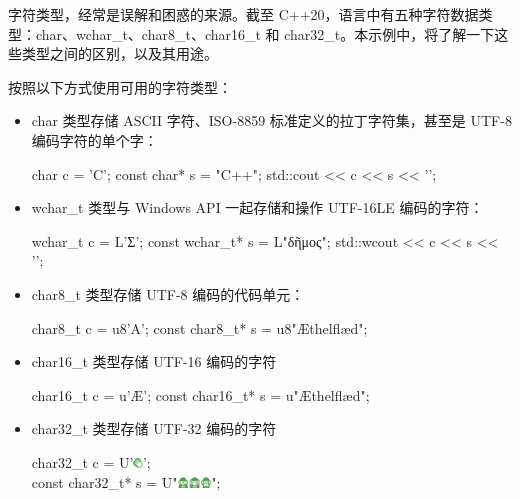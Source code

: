 字符类型，经常是误解和困惑的来源。截至 C++20，语言中有五种字符数据类型：char、wchar\_t、char8\_t、char16\_t 和 char32\_t。本示例中，将了解一下这些类型之间的区别，以及其用途。


按照以下方式使用可用的字符类型：

\begin{itemize}
\item
char 类型存储 ASCII 字符、ISO-8859 标准定义的拉丁字符集，甚至是 UTF-8 编码字符的单个字：

\begin{cpp}
char c = 'C';
const char* s = "C++";
std::cout << c <<  s << '\n';
\end{cpp}

\item
wchar\_t 类型与 Windows API 一起存储和操作 UTF-16LE 编码的字符：

\begin{cpp}
wchar_t c = L'Ʃ';
const wchar_t* s = L"δῆμος";
std::wcout << c << s << '\n';
\end{cpp}

\item
char8\_t 类型存储 UTF-8 编码的代码单元：

\begin{cpp}
char8_t c = u8'A';
const char8_t* s = u8"Æthelflæd";
\end{cpp}

\item
char16\_t 类型存储 UTF-16 编码的字符

\begin{cpp}
char16_t c = u'Æ';
const char16_t* s = u"Æthelflæd";
\end{cpp}

\item
char32\_t 类型存储 UTF-32 编码的字符

\begin{tcolorbox}[ breakable,colback = blue!5!white, colframe=black!7!white]
\scriptsize{
char32\_t c = U'\includegraphics[width=0.02\textwidth]{content/chapter2/images/code-1.png}'; \\
const char32\_t* s = U"\includegraphics[width=0.07\textwidth]{content/chapter2/images/code-2.png}";
}
\end{tcolorbox}

\end{itemize}

